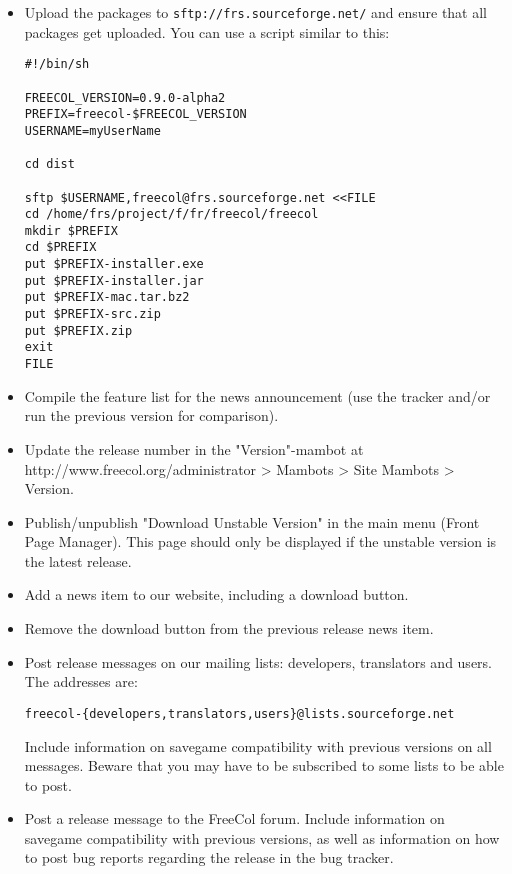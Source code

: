 \documentclass[12pt]{book}
\begin{document}
\begin{itemize}
\item Upload the packages to \verb$sftp://frs.sourceforge.net/$ and ensure that
  all packages get uploaded. You can use a script similar to this:

\begin{verbatim}
#!/bin/sh

FREECOL_VERSION=0.9.0-alpha2
PREFIX=freecol-$FREECOL_VERSION
USERNAME=myUserName

cd dist

sftp $USERNAME,freecol@frs.sourceforge.net <<FILE
cd /home/frs/project/f/fr/freecol/freecol
mkdir $PREFIX
cd $PREFIX
put $PREFIX-installer.exe
put $PREFIX-installer.jar
put $PREFIX-mac.tar.bz2
put $PREFIX-src.zip
put $PREFIX.zip
exit
FILE
\end{verbatim}

\item Compile the feature list for the news announcement (use the tracker
  and/or run the previous version for comparison).

\item Update the release number in the "Version"-mambot at
  http://www.freecol.org/administrator > Mambots > Site Mambots > Version.

\item Publish/unpublish "Download Unstable Version" in the main menu
  (Front Page Manager).  This page should only be displayed if the
  unstable version is the latest release.

\item Add a news item to our website, including a download button.

\item Remove the download button from the previous release news item.

\item Post release messages on our mailing lists: developers,
  translators and users.  The addresses are:

\verb+freecol-{developers,translators,users}@lists.sourceforge.net+

Include information on savegame compatibility with previous versions
on all messages.  Beware that you may have to be subscribed to some
lists to be able to post.

\item Post a release message to the FreeCol forum. Include information
  on savegame compatibility with previous versions, as well as
  information on how to post bug reports regarding the release in the
  bug tracker.

\end{itemize}
\end{document}
